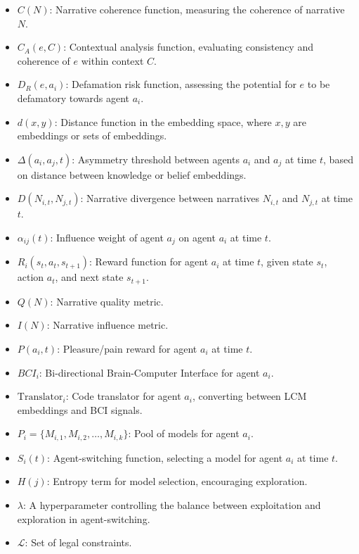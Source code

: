 \documentclass[12pt, a4paper]{article}
\begin{document}
\begin{itemize}
    \item \( C(N) \): Narrative coherence function, measuring the coherence of narrative \( N \).
    \item \( C_A(e, C) \): Contextual analysis function, evaluating consistency and coherence of \( e \) within context \( C \).
    \item \( D_R(e, a_i) \): Defamation risk function, assessing the potential for \( e \) to be defamatory towards agent \( a_i \).
    \item \( d(x, y) \): Distance function in the embedding space, where \( x, y \) are embeddings or sets of embeddings.
    \item \( \Delta(a_i, a_j, t) \): Asymmetry threshold between agents \( a_i \) and \( a_j \) at time \( t \), based on distance between knowledge or belief embeddings.
    \item \( D(N_{i,t}, N_{j,t}) \): Narrative divergence between narratives \( N_{i,t} \) and \( N_{j,t} \) at time \(t\).
    \item \( \alpha_{ij}(t) \): Influence weight of agent \( a_j \) on agent \( a_i \) at time \( t \).
    \item \( R_i(s_t, a_t, s_{t+1}) \): Reward function for agent \( a_i \) at time \(t\), given state \(s_t\), action \(a_t\), and next state \(s_{t+1}\).
    \item \( Q(N) \): Narrative quality metric.
    \item \( I(N) \): Narrative influence metric.
    \item \( P(a_i, t) \): Pleasure/pain reward for agent \( a_i \) at time \( t \).
    \item \( BCI_i \): Bi-directional Brain-Computer Interface for agent \( a_i \).
    \item \( \text{Translator}_i \): Code translator for agent \( a_i \), converting between LCM embeddings and BCI signals.
    \item \( P_i = \{M_{i,1}, M_{i,2}, \dots, M_{i,k}\} \): Pool of models for agent \( a_i \).
    \item \( S_i(t) \): Agent-switching function, selecting a model for agent \( a_i \) at time \( t \).
    \item \( H(j) \): Entropy term for model selection, encouraging exploration.
    \item \( \lambda \): A hyperparameter controlling the balance between exploitation and exploration in agent-switching.
    \item \( \mathcal{L} \): Set of legal constraints.

\end{itemize}
\end{document}
